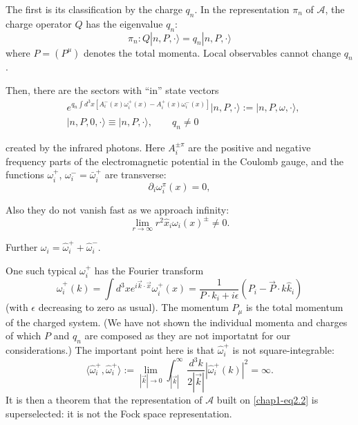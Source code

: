 The first is its classification by the charge $q_{n}$. In the representation $\pi_{n}$ of $\mathcal{A}$, the charge operator $Q$ has the eigenvalue $q_{n}$:
\begin{equation}
\pi_{n}: Q|n,P,\cdot \rangle=q_{n}|n,P,\cdot\rangle\label{chap1-eq2.1}
\end{equation}
where $P = (P^{\mu})$ denotes the total momenta. Local observables cannot change $q_{n}$.

Then, there are the sectors with ``in'' state vectors \cite{key4}
\begin{align}
& e^{q_{n}\int d^{3}x[A^{-}_{i}(x)\omega^{+}_{i}(x)-A^{+}_{i}(x)\omega^{-}_{i}(x)]}|n,P,\cdot\rangle := |n,P,\omega,\cdot\rangle,\label{chap1-eq2.2}\\
& |n,P,0,\cdot\rangle \equiv |n,P,\cdot\rangle,\qquad q_{n}\neq 0\label{chap1-eq2.3}
\end{align}

created by the infrared photons. Here $A^{\pm \pi}_{i}$ are the positive and negative frequency parts of the electromagnetic potential in the Coulomb gauge, and the functions $\omega^{+}_{i}$, $\omega^{-}_{i}=\bar{\omega}^{+}_{i}$ are transverse:
\begin{equation}
\partial_{i}\omega^{\pi}_{i}(x)=0,\label{chap1-eq2.4}
\end{equation}

Also they do not vanish fast as we approach infinity:
\begin{equation}
\lim\limits_{r\to\infty}r^{2}\hat{x}_{i}\omega_{i}(x)^{\pm}\neq 0.\label{chap1-eq2.5}
\end{equation}

Further $\omega_{i} = \hat{\omega}_{i}^{+} + \hat{\omega}_{i}^{-}$.

One such typical $\omega^{+}_{i}$ has the Fourier transform
\begin{equation}
\hat{\omega}_{i}^{+}(k)=\int d^{3}xe^{i\overrightarrow{k}\cdot \overrightarrow{x}}\omega^{+}_{i}(x)=\frac{1}{P\cdot k_{i}+i{\epsilon}}(P_{i}-\overrightarrow{P}\cdot \hat{k}\hat{k}_{i})\label{chap1-eq2.6}
\end{equation}
(with $\epsilon$ decreasing to zero as usual). The momentum $P_{\mu}$ is the total momentum of the charged system. (We have not shown the individual momenta and charges of which $P$ and $q_{n}$ are composed as they are not importatnt for our considerations.) The important point here is that $\hat{\omega}^{+}_{i}$ is not square-integrable:
\begin{equation}
\langle \hat{\omega}_{i}^{+},\hat{\omega}_{i}^{+}\rangle := \lim\limits_{|\overrightarrow{k}|\to 0}\int^{\infty}_{|\overrightarrow{k}|}\frac{d^{3}k}{2|\overrightarrow{k}|}|\hat{\omega}_{i}^{+}(k)|^{2}=\infty.\label{chap1-eq2.7}
\end{equation}
It is then a theorem \cite{key6} that the representation of $\mathcal{A}$ built on \eqref{chap1-eq2.2} is superselected: it is not the Fock space representation.

